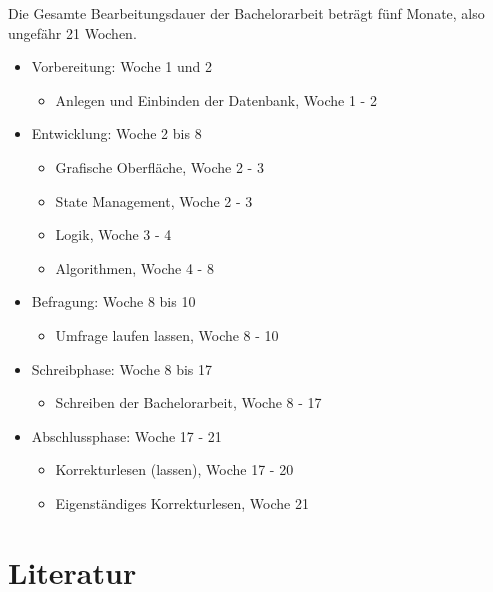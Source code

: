 Die Gesamte Bearbeitungsdauer der Bachelorarbeit beträgt fünf Monate, also ungefähr 21 Wochen.
\begin{itemize}
	\item Vorbereitung: Woche 1 und 2 
		\begin{itemize}
			\item Anlegen und Einbinden der Datenbank, Woche 1 - 2
		\end{itemize}
	\item Entwicklung: Woche 2 bis 8
		\begin{itemize}
			\item Grafische Oberfläche, Woche 2 - 3
			\item State Management, Woche 2 - 3
			\item Logik, Woche 3 - 4
			\item Algorithmen, Woche 4 - 8
		\end{itemize}
	\item Befragung: Woche 8 bis 10
		\begin{itemize}
			\item Umfrage laufen lassen, Woche 8 - 10
		\end{itemize}
	\item Schreibphase: Woche 8 bis 17
		\begin{itemize}
			\item Schreiben der Bachelorarbeit, Woche 8 - 17
		\end{itemize}
	\item Abschlussphase: Woche 17 - 21
		\begin{itemize}
			\item Korrekturlesen (lassen), Woche 17 - 20
			\item Eigenständiges Korrekturlesen, Woche 21
		\end{itemize}
\end{itemize}

\section{Literatur}
\printbibliography[heading=none]








